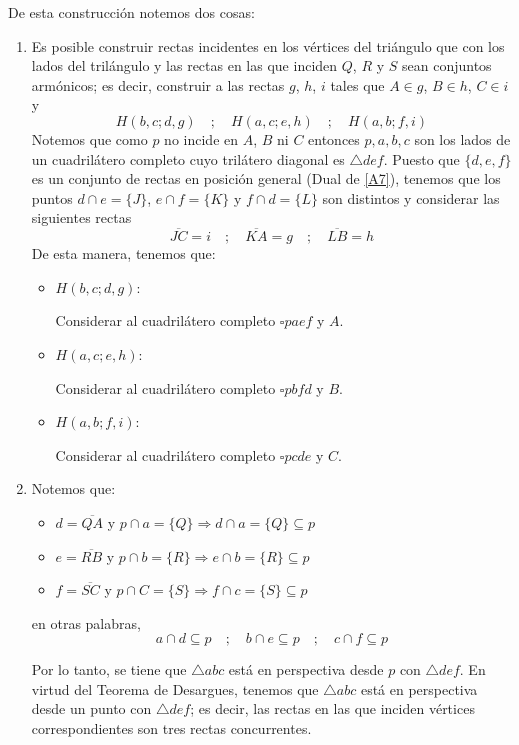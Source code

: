 \documentclass[12pt]{book}
\theoremstyle{definition}
\begin{document}
De esta construcción notemos dos cosas:
\begin{enumerate}
\item\label{puntual1} Es posible construir rectas incidentes en los vértices del triángulo que con los lados del trilángulo y las rectas en las que inciden $Q$, $R$ y $S$ sean conjuntos armónicos; es decir, construir a las rectas $g$, $h$, $i$ tales que $A \in g$, $B \in h$, $C\in i$ y  
$$H(b,c;d,g) \quad ; \quad H(a,c;e,h) \quad ; \quad H(a,b;f,i)$$
Notemos que como $p$ no incide en $A$, $B$ ni $C$ entonces $p, a, b, c$ son los lados de un cuadrilátero completo cuyo trilátero diagonal es $\triangle def$. Puesto que $\{d,e,f\}$ es un conjunto de rectas en posición general (Dual de \ref{A7}), tenemos que los puntos $d \cap e = \{J\}$, $e \cap f =\{K\}$ y $f \cap d =\{L\}$ son distintos y considerar las siguientes rectas
$$\overline{JC}= i\quad ; \quad \overline{KA} = g \quad ; \quad \overline{LB} =h$$
De esta manera, tenemos que:
\begin{itemize}
\item $H(b,c;d,g)$:

Considerar al cuadrilátero completo $\square paef$ y $A$.

\item $H(a,c;e,h)$:

Considerar al cuadrilátero completo $\square pbfd$ y $B$.

\item $H(a,b;f,i)$:

Considerar al cuadrilátero completo $\square pcde$ y $C$.
\end{itemize}



\item\label{puntual2} Notemos que:
\begin{itemize}
\item $d= \overline{QA}$ y $p \cap a = \{Q\} \Rightarrow d \cap a =\{Q\} \subseteq p$
\item $e= \overline{RB}$ y $p \cap b = \{R\} \Rightarrow e \cap b =\{R\} \subseteq p$
\item $f= \overline{SC}$ y $p \cap C = \{S\} \Rightarrow f \cap c =\{S\} \subseteq p$
\end{itemize}
en otras palabras,
$$a \cap d \subseteq p \quad ; \quad b \cap e \subseteq p \quad ; \quad c \cap f \subseteq p$$

Por lo tanto, se tiene que $\triangle abc$ está en perspectiva desde $p$ con $\triangle def$. En virtud del Teorema de Desargues, tenemos que $\triangle abc$ está en perspectiva desde un punto con $\triangle def$; es decir, las rectas en las que inciden vértices correspondientes son tres rectas concurrentes.
\end{enumerate}
\end{document}
